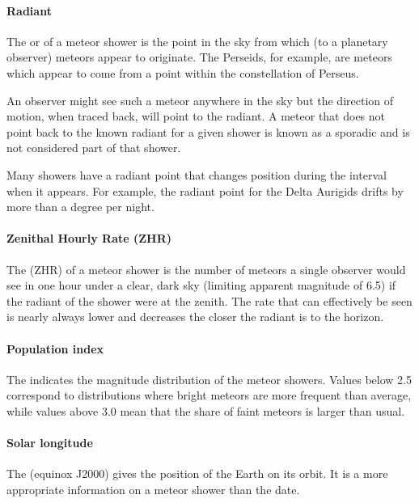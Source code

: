 \paragraph{Radiant}

The  or  of a meteor
shower is the point in the sky from which (to a planetary observer)
meteors appear to originate. The Perseids, for example, are meteors
which appear to come from a point within the constellation of Perseus.

An observer might see such a meteor anywhere in the sky but the
direction of motion, when traced back, will point to the radiant. A
meteor that does not point back to the known radiant for a given
shower is known as a sporadic and is not considered part of that
shower.

Many showers have a radiant point that changes position during the
interval when it appears. For example, the radiant point for the Delta
Aurigids drifts by more than a degree per night.

\paragraph{Zenithal Hourly Rate (ZHR)}

The  (ZHR) of a meteor
shower is the number of meteors a single observer would see in one
hour under a clear, dark sky (limiting apparent magnitude of 6.5) if
the radiant of the shower were at the zenith. The rate that can
effectively be seen is nearly always lower and decreases the closer
the radiant is to the horizon.

\paragraph{Population index}

The  indicates the magnitude distribution
of the meteor showers. Values below 2.5 correspond to
distributions where bright meteors are more frequent than average,
while values above 3.0 mean that the share of faint meteors is larger
than usual.

\paragraph{Solar longitude}

The  (equinox J2000) gives the position of the Earth on its orbit.
It is a more appropriate information on a meteor shower than the date.


